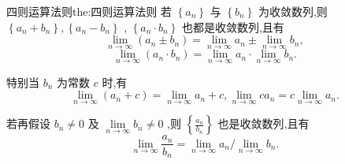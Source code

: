 \begin{theorem}{四则运算法则}{the:四则运算法则}
若 \(\left\{  {a}_{n}\right\}\) 与 \(\left\{  {b}_{n}\right\}\) 为收敛数列,则 \(\left\{  {{a}_{n} + {b}_{n}}\right\}  ,\left\{  {{a}_{n} - {b}_{n}}\right\}\) , \(\left\{  {{a}_{n} \cdot  {b}_{n}}\right\}\) 也都是收敛数列,且有
\[
\mathop{\lim }\limits_{{n \rightarrow  \infty }}\left( {{a}_{n} \pm  {b}_{n}}\right)  = \mathop{\lim }\limits_{{n \rightarrow  \infty }}{a}_{n} \pm  \mathop{\lim }\limits_{{n \rightarrow  \infty }}{b}_{n},
\]
\[
\mathop{\lim }\limits_{{n \rightarrow  \infty }}\left( {{a}_{n} \cdot  {b}_{n}}\right)  = \mathop{\lim }\limits_{{n \rightarrow  \infty }}{a}_{n} \cdot  \mathop{\lim }\limits_{{n \rightarrow  \infty }}{b}_{n}.
\]

特别当 \({b}_{n}\) 为常数 \(c\) 时,有
\[
\mathop{\lim }\limits_{{n \rightarrow  \infty }}\left( {{a}_{n} + c}\right)  = \mathop{\lim }\limits_{{n \rightarrow  \infty }}{a}_{n} + c,\mathop{\lim }\limits_{{n \rightarrow  \infty }}c{a}_{n} = c\mathop{\lim }\limits_{{n \rightarrow  \infty }}{a}_{n}.
\]

若再假设 \({b}_{n} \neq  0\) 及 \(\mathop{\lim }\limits_{{n \rightarrow  \infty }}{b}_{n} \neq  0\) ,则 \(\left\{  \frac{{a}_{n}}{{b}_{n}}\right\}\) 也是收敛数列,且有
\[
\mathop{\lim }\limits_{{n \rightarrow  \infty }}\frac{{a}_{n}}{{b}_{n}} = \mathop{\lim }\limits_{{n \rightarrow  \infty }}{a}_{n}/\mathop{\lim }\limits_{{n \rightarrow  \infty }}{b}_{n}.
\]
\end{theorem}


